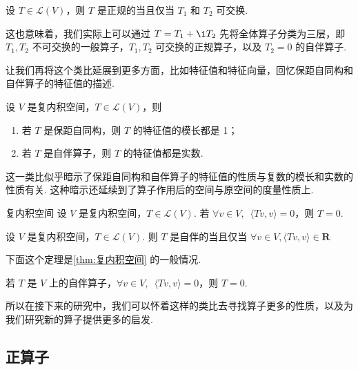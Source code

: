 \begin{theorem}{}{}
    设 $ T \in \mathcal{L}(V) $，则 $ T $ 是正规的当且仅当 $ T_1 $ 和 $ T_2 $ 可交换.
\end{theorem}

这也意味着，我们实际上可以通过 $ T = T_1 + \i T_2 $ 先将全体算子分类为三层，即 $ T_1, T_2 $ 不可交换的一般算子，$ T_1, T_2 $ 可交换的正规算子，以及 $ T_2 = 0 $ 的自伴算子.

让我们再将这个类比延展到更多方面，比如特征值和特征向量，回忆保距自同构和自伴算子的特征值的描述.

\begin{theorem}{}{}
    设 $ V $ 是复内积空间，$ T \in \mathcal{L}(V) $，则
    \begin{enumerate}
        \item 若 $ T $ 是保距自同构，则 $ T $ 的特征值的模长都是 1；

        \item 若 $ T $ 是自伴算子，则 $ T $ 的特征值都是实数.
    \end{enumerate}
\end{theorem}

这一类比似乎暗示了保距自同构和自伴算子的特征值的性质与复数的模长和实数的性质有关. 这种暗示还延续到了算子作用后的空间与原空间的度量性质上.

\begin{theorem}{}{复内积空间}
    设 $ V $ 是复内积空间，$ T \in \mathcal{L}(V) $. 若 $ \forall v \in V,\enspace \langle Tv, v \rangle = 0 $，则 $ T = 0 $.
\end{theorem}

\begin{theorem}{}{}
    设 $ V $ 是复内积空间，$ T \in \mathcal{L}(V) $. 则 $ T $ 是自伴的当且仅当 $ \forall v \in V, \langle Tv, v \rangle \in \mathbf{R} $
\end{theorem}

下面这个定理是\autoref{thm:复内积空间} 的一般情况.

\begin{theorem}{}{}
    若 $ T $ 是 $ V $ 上的自伴算子，$ \forall v \in V,\enspace \langle Tv, v \rangle = 0 $，则 $ T = 0 $.
\end{theorem}

所以在接下来的研究中，我们可以怀着这样的类比去寻找算子更多的性质，以及为我们研究新的算子提供更多的启发.

\subsection{正算子}

